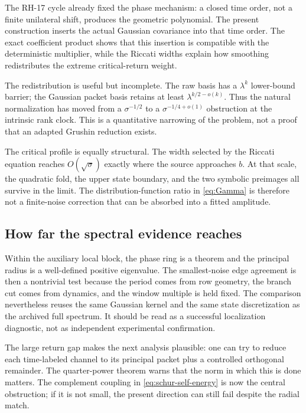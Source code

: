 \documentclass[11pt]{article}
\theoremstyle{definition}
\theoremstyle{remark}
\begin{document}
The RH-17 cycle already fixed the phase mechanism: a closed time order, not a
finite unilateral shift, produces the geometric polynomial.  The present
construction inserts the actual Gaussian covariance into that time order.
The exact coefficient product shows that this insertion is compatible with
the deterministic multiplier, while the Riccati widths explain how smoothing
redistributes the extreme critical-return weight.

The redistribution is useful but incomplete.  The raw basis has a
$\lambda^k$ lower-bound barrier; the Gaussian packet basis retains at least
$\lambda^{k/2-o(k)}$.  Thus the natural normalization has moved from a
$\sigma^{-1/2}$ to a $\sigma^{-1/4+o(1)}$ obstruction at the intrinsic rank
clock.  This is a quantitative narrowing of the problem, not a proof that an
adapted Grushin reduction exists.

The critical profile is equally structural.  The width selected by the
Riccati equation reaches $O(\sqrt\sigma)$ exactly where the source approaches
$b$.  At that scale, the quadratic fold, the upper state boundary, and the
two symbolic preimages all survive in the limit.  The distribution-function
ratio in \eqref{eq:Gamma} is therefore not a finite-noise correction that can
be absorbed into a fitted amplitude.

\subsection{How far the spectral evidence reaches}

Within the auxiliary local block, the phase ring is a theorem and the
principal radius is a well-defined positive eigenvalue.  The smallest-noise
edge agreement is then a nontrivial test because the period comes from row
geometry, the branch cut comes from dynamics, and the window multiple is
held fixed.  The comparison nevertheless reuses the same Gaussian kernel
and the same state discretization as the archived full spectrum.  It should
be read as a successful localization diagnostic, not as independent
experimental confirmation.

The large return gap makes the next analysis plausible: one can try to
reduce each time-labeled channel to its principal packet plus a controlled
orthogonal remainder.  The quarter-power theorem warns that the norm in
which this is done matters.  The complement coupling in
\eqref{eq:schur-self-energy} is now the central obstruction; if it is not
small, the present direction can still fail despite the radial match.
\end{document}
